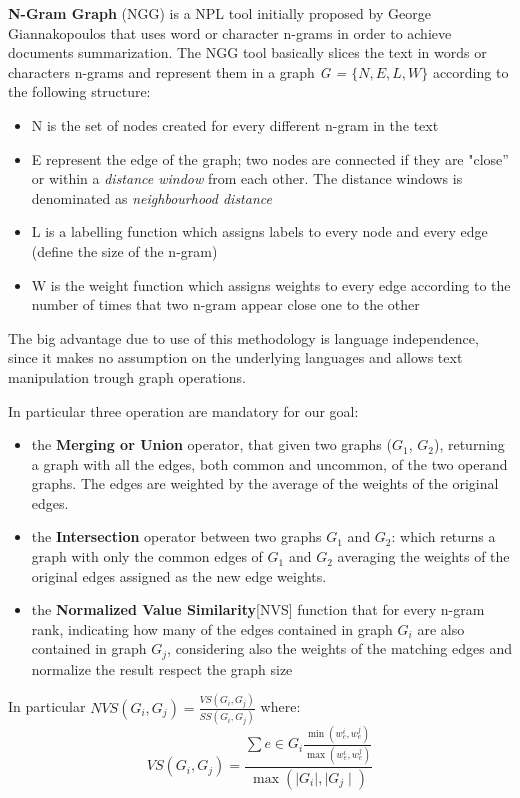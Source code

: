 \textbf{N-Gram Graph} (NGG) is a NPL tool initially proposed by George Giannakopoulos \cite{Ngram} that uses word or character n-grams in order to achieve documents summarization. The NGG tool basically slices the text in words or characters n-grams and represent them in a graph \emph{G = $\lbrace N,E,L,W\rbrace$} according to the following structure:
\begin{itemize}
	\item N is the set of nodes created for every different n-gram in the text
	\item E represent the edge of the graph; two nodes are connected if they are "close'' or within a \emph{distance window} from each other. The distance windows is denominated as \emph{neighbourhood distance}
	\item L is a labelling function which assigns labels to every node and every edge (define the size of the n-gram)
	\item W is the weight function which assigns weights to every edge according to the number of times that two n-gram appear close one to the other
\end{itemize}

The big advantage due to use of this methodology is language
independence, since it makes no assumption on the underlying languages and
allows text manipulation trough graph operations.

In particular three operation are mandatory for our goal:
\begin{itemize}
	\item the \textbf{Merging or Union } operator, that given two graphs ($G_1$, $G_2$), returning a graph with all the edges, both common and uncommon, of the two operand graphs. The edges are weighted by the average of the weights of the original edges.
	\item the \textbf{Intersection} operator between two graphs $G_1$ and $G_2$: which returns a graph with only the common edges of $G_1$ and $G_2$ averaging the weights of the original edges assigned as the new edge weights.
	\item the \textbf{Normalized Value Similarity}[NVS] function that for every n-gram rank, indicating how many of the edges contained in graph $G_i$ are also contained in graph $G_j$, considering also the weights of the matching edges and normalize the result respect the graph size
\end{itemize}

In particular $NVS(G_i,G_j) = \frac{VS(G_i,G_j)}{SS(G_i,G_j)}$ where:
\begin{equation}
 VS(G_i,G_j)=\frac{\sum e \in G_i \frac{\min(w_e^i, w_e^j)}{\max(w_e^i, w_e^j)}}{\max(\mid G_i \mid, \mid G_j \mid)}
\end{equation}

